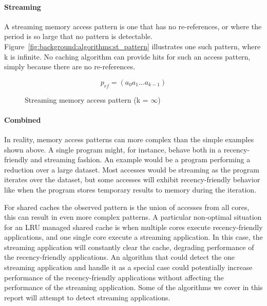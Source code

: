 \paragraph{Streaming}
A streaming memory access pattern is one that has no re-references, or where the period is so large that no pattern is detectable.
Figure~\ref{fig:background:algorithms:st_pattern} illustrates one such pattern, where k is infinite.
No caching algorithm can provide hits for such an access pattern, simply because there are no re-references.

\begin{figure}[ht]
\centering
\begin{equation} \label{fig:background:algorithms:st_pattern}
p_{rf} = (a_0 a_1 ... a_{k-1})
\end{equation}
\caption{Streaming memory access  pattern (k = $\infty$) }
\end{figure}

\paragraph{Combined}
In reality, memory access patterns can more complex than the simple examples shown above.
A single program might, for instance, behave both in a recency-friendly and streaming fashion. 
An example would be a program performing a reduction over a large dataset.
Most accesses would be streaming as the program iterates over the dataset, but some accesses will exhibit recency-friendly behavior like when the program stores temporary results to memory during the iteration.

For shared caches the observed pattern is the union of accesses from all cores, this can result in even more complex patterns.
A particular non-optimal situation for an LRU managed shared cache is when multiple cores execute recency-friendly applications, and one single core execute a streaming application.
In this case, the streaming application will constantly clear the cache, degrading performance of the recency-friendly applications.
An algorithm that could detect the one streaming application and handle it as a special case could potentially increase performance of the recency-friendly applications without affecting the performance of the streaming application.
Some of the algorithms we cover in this report will attempt to detect streaming applications.